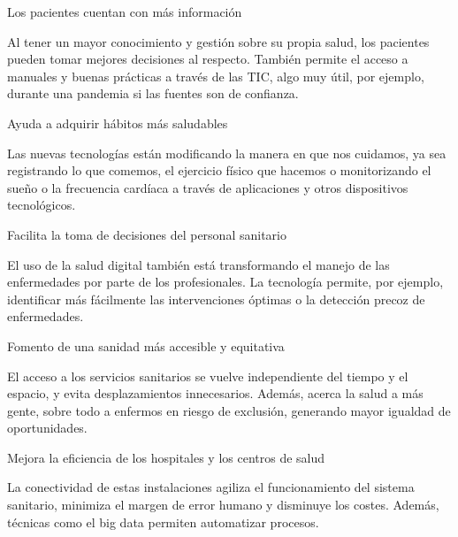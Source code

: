 \documentclass[12pt]{article}
\begin{document}
Los pacientes cuentan con más información

Al tener un mayor conocimiento y gestión sobre su propia salud, los pacientes pueden tomar mejores decisiones al respecto. También permite el acceso a manuales y buenas prácticas a través de las TIC, algo muy útil, por ejemplo, durante una pandemia si las fuentes son de confianza.
   
   Ayuda a adquirir hábitos más saludables

Las nuevas tecnologías están modificando la manera en que nos cuidamos, ya sea registrando lo que comemos, el ejercicio físico que hacemos o monitorizando el sueño o la frecuencia cardíaca a través de aplicaciones y otros dispositivos tecnológicos.

   Facilita la toma de decisiones del personal sanitario

El uso de la salud digital también está transformando el manejo de las enfermedades por parte de los profesionales. La tecnología permite, por ejemplo, identificar más fácilmente las intervenciones óptimas o la detección precoz de enfermedades.

   Fomento de una sanidad más accesible y equitativa

El acceso a los servicios sanitarios se vuelve independiente del tiempo y el espacio, y evita desplazamientos innecesarios. Además, acerca la salud a más gente, sobre todo a enfermos en riesgo de exclusión, generando mayor igualdad de oportunidades.
  
   Mejora la eficiencia de los hospitales y los centros de salud

La conectividad de estas instalaciones agiliza el funcionamiento del sistema sanitario, minimiza el margen de error humano y disminuye los costes. Además, técnicas como el big data permiten automatizar procesos.
\end{document}
